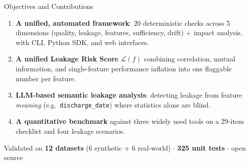 \documentclass[11pt,aspectratio=169]{beamer}
\begin{document}
\begin{frame}{Objectives and Contributions}
  \begin{enumerate}\setlength\itemsep{0.8em}
    \item \textbf{A unified, automated framework}: 20 deterministic checks across 5 dimensions (quality, leakage, features, sufficiency, drift) + impact analysis, with CLI, Python SDK, and web interfaces.
    \item \textbf{A unified Leakage Risk Score} $\mathcal{L}(f)$ combining correlation, mutual information, and single-feature performance inflation into one flaggable number per feature.
    \item \textbf{LLM-based semantic leakage analysis}: detecting leakage from feature \emph{meaning} (e.g.\ \texttt{discharge\_date}) where statistics alone are blind.
    \item \textbf{A quantitative benchmark} against three widely used tools on a 29-item checklist and four leakage scenarios.
  \end{enumerate}
  \vspace{0.5em}
  \centering\footnotesize
  Validated on \textbf{12 datasets} (6 synthetic + 6 real-world) $\cdot$ \textbf{325 unit tests} $\cdot$ open source
\end{frame}
\end{document}
